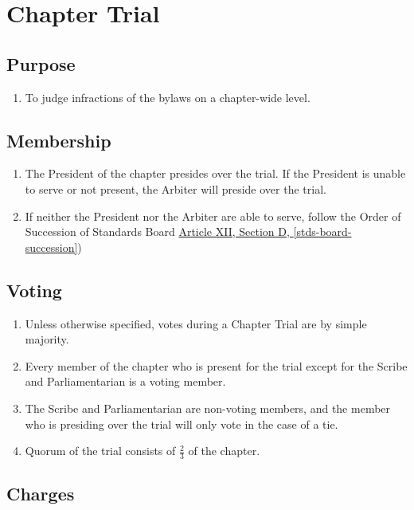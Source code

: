 \chapter{Chapter Trial}
\label{chp-trial}

\section{Purpose}

	\begin{enumerate}
		\item To judge infractions of the bylaws on a chapter-wide level.
	\end{enumerate}

\section{Membership}
	
	\begin{enumerate}
		\item The President of the chapter presides over the trial. If the President is unable to serve or not present, the Arbiter will preside over the trial.
		\item If neither the President nor the Arbiter are able to serve, follow the Order of Succession of Standards Board \hyperref[stds-board-succession]{Article XII, Section D, \autoref*{stds-board-succession}})
	\end{enumerate}

\section{Voting}
	
	\begin{enumerate}
		\item Unless otherwise specified, votes during a Chapter Trial are by simple majority.
		\item Every member of the chapter who is present for the trial except for the Scribe and Parliamentarian is a voting member.
		\item The Scribe and Parliamentarian are non-voting members, and the member who is presiding over the trial will only vote in the case of a tie.
		\item Quorum of the trial consists of $\frac{2}{3}$ of the chapter.
	\end{enumerate}

\section{Charges}
	
